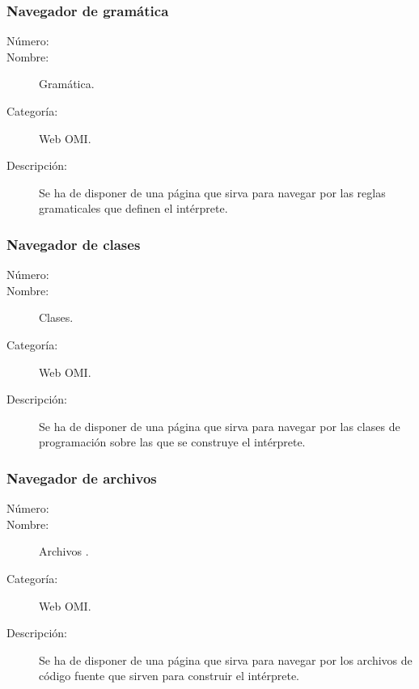 \subsubsection{Navegador de gramática}
\begin{framed}
	\begin{description}
		\item [Número:] \cn
		\item [Nombre:] Gramática.
		\item [Categoría:] Web OMI.
		\item [Descripción:]  Se ha de disponer de una página que sirva para navegar por las reglas gramaticales que definen el intérprete.
	\end {description}
\end{framed}

\subsubsection{Navegador de clases}
\begin{framed}
	\begin{description}
		\item [Número:] \cn
		\item [Nombre:] Clases.
		\item [Categoría:] Web OMI.
		\item [Descripción:]  Se ha de disponer de una página que sirva para navegar por las clases de programación sobre las que se construye el 
      intérprete.
	\end {description}
\end{framed}

\subsubsection{Navegador de archivos}
\begin{framed}
	\begin{description}
		\item [Número:] \cn
		\item [Nombre:] Archivos .
		\item [Categoría:] Web OMI.
		\item [Descripción:]  Se ha de disponer de una página que sirva para navegar por los archivos de código fuente que sirven para construir el intérprete.
	\end {description}
\end{framed}

